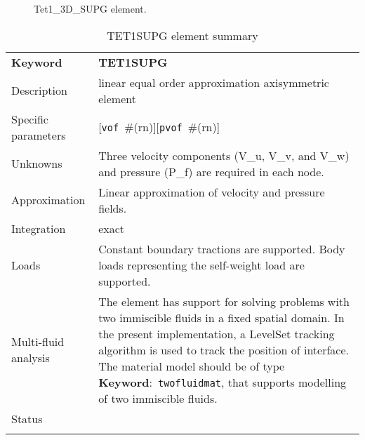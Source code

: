\documentclass[a4paper]{article}
\newcommand{\descitem}[1]{{\noindent \textbf{#1}}:}
\newcommand{\elemkeyword}[1]{\descitem{Keyword}~\param{#1}} %
\newcommand{\param}[1]{\texttt{#1}} %
\newcommand{\optional}[1]{[#1]} %
\newcommand{\field}[2]{\param{#1}~\#{\tiny(#2)}} %
\newcommand{\optField}[2]{\optional{\field{#1}{#2}}}
\newcommand{\templabel}{}%
\newcommand{\tempcaption}{}%
\newcounter{nelpar}
\newenvironment{elementsummary}[5]{%
  \gdef\tempcaption{#4}%
  \gdef\templabel{#5}%
  \setcounter{nelpar}{0}%
  \begin{center} %
    \begin{table}[!htb] %
      \begin{tabular}{|l|p{9cm}|}\hline %
        {\bf Keyword} & \bf{#1}\\ %
        {Description} & {#2}\\ %
        {Specific parameters} & {#3}\\ \hline %
}{
  \\ \hline %
      \end{tabular}%
      \caption{\tempcaption}%
      \label{\templabel}%
    \end{table}%
  \end{center}%
}
\newcommand{\elementDescription}[2]{{#1} & {#2}\\ }
\begin{document}
\begin{figure}[htb]
 \centering
 \begin{makeimage}
  
 \end{makeimage}
 \caption{Tet1\_3D\_SUPG element.}
 \label{PY1_3D_SUPGfig}
\end{figure}

\begin{elementsummary}{TET1SUPG}{linear equal order approximation axisymmetric element}
  {\optField{vof}{rn}\optField{pvof}{rn}}{TET1SUPG element summary}{TET1SUPGsummary}
\elementDescription{Unknowns}{Three velocity components (V\_u, V\_v, and V\_w) and pressure (P\_f) are required in each node.}
\elementDescription{Approximation}{Linear approximation of velocity and pressure fields.}
\elementDescription{Integration}{exact}
\elementDescription{Loads}{Constant boundary tractions are supported. Body loads
representing the self-weight load are supported.}
\elementDescription{Multi-fluid analysis}{The element has support for solving
problems with two immiscible fluids in
a fixed spatial domain. In the present implementation, a LevelSet tracking algorithm
is used to track the position of interface. 
The material model should be of type \elemkeyword{twofluidmat}, that
supports modelling of two immiscible fluids.}
\elementDescription{Status}{}
\end{elementsummary}


\end{document}
